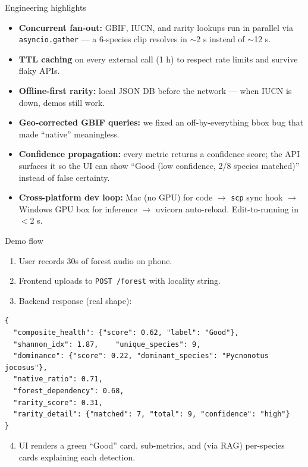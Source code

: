 \documentclass[aspectratio=169]{beamer}
\begin{document}
\begin{frame}{Engineering highlights}
  \begin{itemize}
    \item \textbf{Concurrent fan-out:} GBIF, IUCN, and rarity lookups run in parallel via \texttt{asyncio.gather} --- a 6-species clip resolves in $\sim$2 s instead of $\sim$12 s.
    \item \textbf{TTL caching} on every external call (1 h) to respect rate limits and survive flaky APIs.
    \item \textbf{Offline-first rarity:} local JSON DB before the network --- when IUCN is down, demos still work.
    \item \textbf{Geo-corrected GBIF queries:} we fixed an off-by-everything bbox bug that made ``native'' meaningless.
    \item \textbf{Confidence propagation:} every metric returns a confidence score; the API surfaces it so the UI can show ``Good (low confidence, 2/8 species matched)'' instead of false certainty.
    \item \textbf{Cross-platform dev loop:} Mac (no GPU) for code $\rightarrow$ \texttt{scp} sync hook $\rightarrow$ Windows GPU box for inference $\rightarrow$ uvicorn auto-reload. Edit-to-running in $<$2 s.
  \end{itemize}
\end{frame}

\begin{frame}[fragile]{Demo flow}
  \begin{enumerate}
    \item User records 30s of forest audio on phone.
    \item Frontend uploads to \texttt{POST /forest} with locality string.
    \item Backend response (real shape):
  \end{enumerate}
\begin{lstlisting}[style=mini]
{
  "composite_health": {"score": 0.62, "label": "Good"},
  "shannon_idx": 1.87,    "unique_species": 9,
  "dominance": {"score": 0.22, "dominant_species": "Pycnonotus jocosus"},
  "native_ratio": 0.71,
  "forest_dependency": 0.68,
  "rarity_score": 0.31,
  "rarity_detail": {"matched": 7, "total": 9, "confidence": "high"}
}
\end{lstlisting}
  \begin{enumerate}\setcounter{enumi}{3}
    \item UI renders a green ``Good'' card, sub-metrics, and (via RAG) per-species cards explaining each detection.
  \end{enumerate}
\end{frame}
\end{document}
